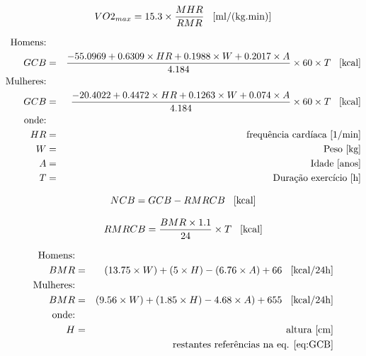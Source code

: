 \documentclass[a4paper,10pt]{report}
\begin{document}
\begin{equation} \label{eq:VO2max} 
VO2_{max} = 15.3 \times \frac{MHR}{RMR} \text{\hspace*{0.3cm}[ml/(kg.min)]}
\end{equation}

\begin{eqnarray} \label{eq:GCB}
\text{Homens:}&&\\ 
GCB &=& \frac{-55.0969 + 0.6309 \times HR + 0.1988 \times W + 0.2017 \times A}{4.184} \times 60 \times T \text{\hspace*{0.3cm}[kcal]}\nonumber\\
\text{Mulheres:}&&\nonumber\\ 
GCB &=& \frac{-20.4022 + 0.4472 \times HR + 0.1263 \times W + 0.074 \times A}{4.184} \times 60 \times T \text{\hspace*{0.3cm}[kcal]}\nonumber\\
\text{onde:}&& \nonumber\\
HR &=& \text{frequência cardíaca [1/min]}\nonumber\\ 
W &=& \text{Peso [kg]}\nonumber\\
A &=& \text{Idade [anos]}\nonumber\\
T &=& \text{Duração exercício [h]}\nonumber
\end{eqnarray}

\begin{equation} \label{eq:NCB} 
NCB = GCB - RMRCB \text{\hspace*{0.3cm}[kcal]}
\end{equation}

\begin{equation} \label{eq:RMRCB} 
RMRCB = \frac{BMR \times 1.1}{24} \times T \text{\hspace*{0.3cm}[kcal]}
\end{equation}

\begin{eqnarray} \label{eq:BMR}
\text{Homens:}&&\\
BMR &=& (13.75 \times W) + (5 \times H) - (6.76 \times A) + 66 \text{\hspace*{0.3cm}[kcal/24h]}\nonumber\\
\text{Mulheres:}&&\nonumber\\ 
BMR &=& (9.56 \times W) + (1.85 \times H) - 4.68 \times A) + 655 \text{\hspace*{0.3cm}[kcal/24h]}\nonumber\\
\text{onde:}&& \nonumber\\
H &=& \text{altura [cm]}\nonumber\\ 
&&\text{restantes referências na eq. \ref{eq:GCB}}\nonumber
\end{eqnarray}
\end{document}
